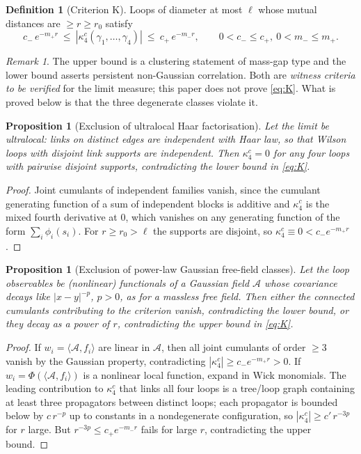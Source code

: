 \documentclass[11pt,a4paper]{article}
\newtheorem{proposition}[theorem]{Proposition}
\theoremstyle{definition}
\newtheorem{definition}[theorem]{Definition}
\theoremstyle{remark}
\newtheorem{remark}[theorem]{Remark}
\begin{document}
\begin{definition}[Criterion $\mathrm K$]
Loops of diameter at most $\ell$ whose mutual distances are $\ge r\ge r_0$ satisfy
\begin{equation}\label{eq:K}
c_-\,e^{-m_+r}\ \le\ |\kappa_4^c(\gamma_1,\dots,\gamma_4)|\ \le\ c_+\,e^{-m_-r},\qquad 0<c_-\le c_+,\ 0<m_-\le m_+ .
\end{equation}
\end{definition}

\begin{remark}
The upper bound is a clustering statement of mass-gap type and the lower bound asserts persistent non-Gaussian correlation. Both are \emph{witness criteria to be verified} for the limit measure; this paper does not prove \eqref{eq:K}. What is proved below is that the three degenerate classes violate it.
\end{remark}

\begin{proposition}[Exclusion of ultralocal Haar factorisation]
Let the limit be ultralocal: links on distinct edges are independent with Haar law, so that Wilson loops with disjoint link supports are independent. Then $\kappa_4^c=0$ for any four loops with pairwise disjoint supports, contradicting the lower bound in \eqref{eq:K}.
\end{proposition}
\begin{proof}
Joint cumulants of independent families vanish, since the cumulant generating function of a sum of independent blocks is additive and $\kappa_4^c$ is the mixed fourth derivative at $0$, which vanishes on any generating function of the form $\sum_i\phi_i(s_i)$. For $r\ge r_0>\ell$ the supports are disjoint, so $\kappa_4^c\equiv0<c_-e^{-m_+r}$.
\end{proof}

\begin{proposition}[Exclusion of power-law Gaussian free-field classes]
Let the loop observables be (nonlinear) functionals of a Gaussian field $\mathcal A$ whose covariance decays like $|x-y|^{-p}$, $p>0$, as for a massless free field. Then either the connected cumulants contributing to the criterion vanish, contradicting the lower bound, or they decay as a power of $r$, contradicting the upper bound in \eqref{eq:K}.
\end{proposition}
\begin{proof}
If $w_i=\langle\mathcal A,f_i\rangle$ are linear in $\mathcal A$, then all joint cumulants of order $\ge3$ vanish by the Gaussian property, contradicting $|\kappa_4^c|\ge c_-e^{-m_+r}>0$. If $w_i=\Phi(\langle\mathcal A,f_i\rangle)$ is a nonlinear local function, expand in Wick monomials. The leading contribution to $\kappa_4^c$ that links all four loops is a tree/loop graph containing at least three propagators between distinct loops; each propagator is bounded below by $c\,r^{-p}$ up to constants in a nondegenerate configuration, so $|\kappa_4^c|\ge c'\,r^{-3p}$ for $r$ large. But $r^{-3p}\le c_+e^{-m_-r}$ fails for large $r$, contradicting the upper bound.
\end{proof}
\end{document}
